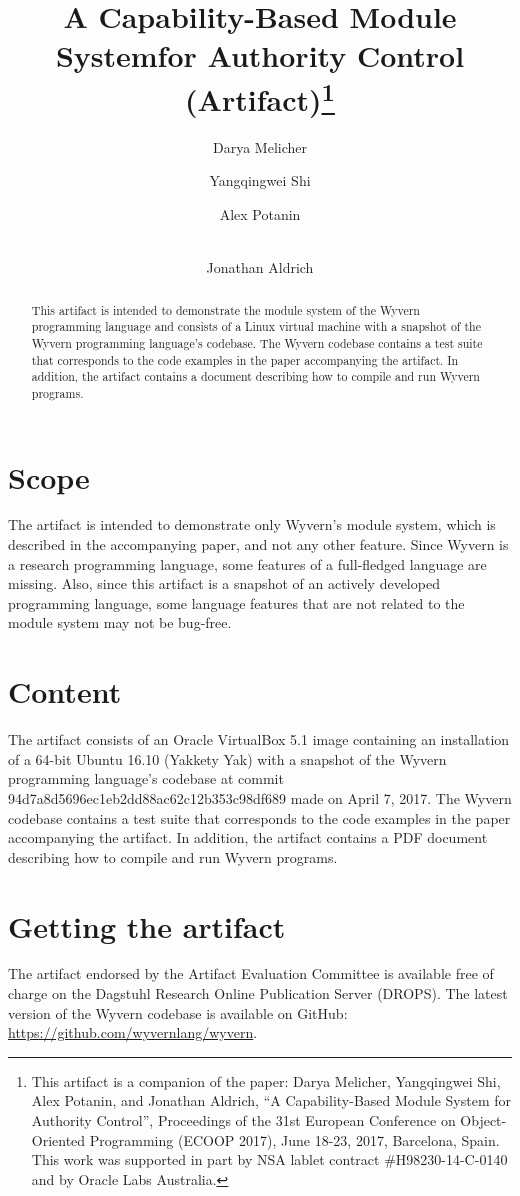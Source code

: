 \documentclass[a4paper,UKenglish]{darts}
\title{A Capability-Based Module System\newline for Authority Control (Artifact)\footnote{This artifact is a companion of the paper:  Darya Melicher, Yangqingwei Shi, Alex Potanin, and Jonathan Aldrich, ``A Capability-Based Module System for Authority Control'', Proceedings of the 31st European Conference on Object-Oriented Programming (ECOOP 2017), June 18-23, 2017, Barcelona, Spain. This work was supported in part by NSA lablet contract \#H98230-14-C-0140 and by Oracle Labs Australia.}}
\author[1]{Darya Melicher}
\author[2]{Yangqingwei Shi}
\author[3]{Alex Potanin}
\author[4]{\\Jonathan Aldrich}
\affil[1]{Carnegie Mellon University, Pittsburgh, PA, USA}
\affil[2]{Carnegie Mellon University, Pittsburgh, PA, USA}
\affil[3]{Victoria University of Wellington, Wellington, New Zealand}
\affil[4]{Carnegie Mellon University, Pittsburgh, PA, USA}
\newenvironment{scope}{\section{Scope}}{}
\newenvironment{content}{\section{Content}}{}
\newenvironment{getting}{\section{Getting the artifact} The artifact 
endorsed by the Artifact Evaluation Committee is available free of 
charge on the Dagstuhl Research Online Publication Server (DROPS).}{}
\begin{document}
\maketitle

\begin{abstract}
This artifact is intended to demonstrate the module system of the Wyvern programming language and consists of a Linux virtual machine with a snapshot of the Wyvern programming language's codebase. The Wyvern codebase contains a test suite that corresponds to the code examples in the paper accompanying the artifact. In addition, the artifact contains a document describing how to compile and run Wyvern programs.
 \end{abstract}


\begin{scope}
The artifact is intended to demonstrate only Wyvern's module system, which is described in the accompanying paper, and not any other feature. Since Wyvern is a research programming language, some features of a full-fledged language are missing. Also, since this artifact is a snapshot of an actively developed programming language, some language features that are not related to the module system may not be bug-free.
\end{scope}

\begin{content}
The artifact consists of an Oracle VirtualBox 5.1 image containing an installation of a 64-bit Ubuntu 16.10 (Yakkety Yak) with a snapshot of the Wyvern programming language's codebase at commit 94d7a8d5696ec1eb2dd88ac62c12b353c98df689 made on April 7, 2017. The Wyvern codebase contains a test suite that corresponds to the code examples in the paper accompanying the artifact. In addition, the artifact contains a PDF document describing how to compile and run Wyvern programs.
\end{content} 

\begin{getting}
  The latest version of the Wyvern codebase is available on GitHub: \url{https://github.com/wyvernlang/wyvern}.
\end{getting} 
\end{document}
